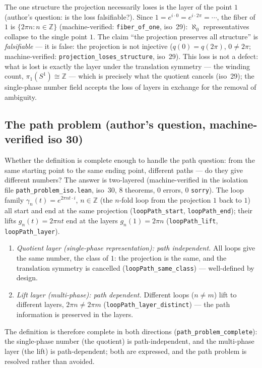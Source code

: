 \documentclass{article}
\begin{document}
The one structure the projection necessarily loses is the layer of the
point $1$ (author's question: is the loss falsifiable?). Since
$1=e^{i\cdot 0}=e^{i\cdot 2\pi}=\cdots$, the fiber of $1$ is
$\{2\pi n:n\in\mathbb Z\}$ (machine-verified:
\texttt{fiber\_of\_one}, iso~29): $\aleph_0$ representatives collapse
to the single point $1$. The claim ``the projection preserves all
structure'' is \emph{falsifiable} --- it is false: the projection is
not injective ($q(0)=q(2\pi)$, $0\neq 2\pi$; machine-verified:
\texttt{projection\_loses\_structure}, iso~29). This loss is not a
defect: what is lost is exactly the layer under the translation
symmetry --- the winding count, $\pi_1(S^1)\cong\mathbb Z$ --- which is
precisely what the quotient cancels (iso~29); the single-phase number
field accepts the loss of layers in exchange for the removal of
ambiguity.

\subsection*{The path problem (author's question, machine-verified iso 30)}

Whether the definition is complete enough to handle the path question:
from the same starting point to the same ending point, different paths
--- do they give different numbers? The answer is two-layered
(machine-verified in the isolation file \texttt{path\_problem\_iso.lean},
iso~30, 8 theorems, 0 errors, 0 \texttt{sorry}). The loop family
$\gamma_n(t)=e^{2\pi n t\cdot i}$, $n\in\mathbb Z$ (the $n$-fold loop
from the projection $1$ back to $1$) all start and end at the same
projection
(\texttt{loopPath\_start}, \texttt{loopPath\_end}); their lifts
$g_n(t)=2\pi n t$ end at the layers $g_n(1)=2\pi n$
(\texttt{loopPath\_lift}, \texttt{loopPath\_layer}).

\begin{enumerate}
\item \emph{Quotient layer (single-phase representation): path
independent.} All loops give the same number, the class of $1$: the
projection is the same, and the translation symmetry is cancelled
(\texttt{loopPath\_same\_class}) --- well-defined by design.
\item \emph{Lift layer (multi-phase): path dependent.} Different loops
($n\neq m$) lift to different layers, $2\pi n\neq 2\pi m$
(\texttt{loopPath\_layer\_distinct}) --- the path information is
preserved in the layers.
\end{enumerate}

The definition is therefore complete in both directions
(\texttt{path\_problem\_complete}): the single-phase number (the
quotient) is path-independent, and the multi-phase layer (the lift) is
path-dependent; both are expressed, and the path problem is resolved
rather than avoided.
\end{document}
